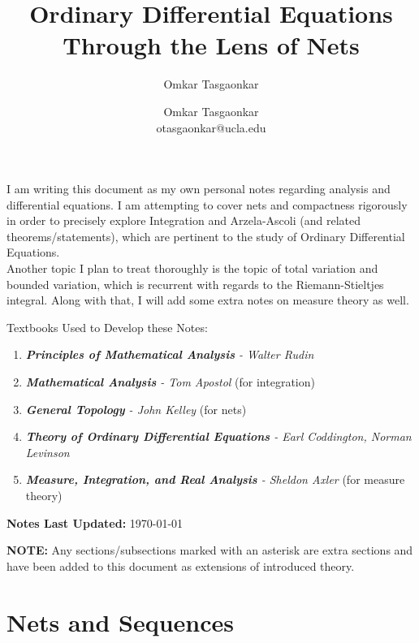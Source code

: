 \documentclass[10pt,letterpaper]{article} %
\author{Omkar Tasgaonkar}
\title{Ordinary Differential Equations \\[0.5em] \large Through the Lens of Nets}
\author{Omkar Tasgaonkar \\ \small otasgaonkar@ucla.edu}
\date{}
\begin{document}
\maketitle
I am writing this document as my own personal notes regarding analysis and differential equations. I am attempting to cover nets and compactness rigorously in order to precisely explore Integration and Arzela-Ascoli (and related theorems/statements), which are pertinent to the study of Ordinary Differential Equations.\\

Another topic I plan to treat thoroughly is the topic of total variation and bounded variation, which is recurrent with regards to the Riemann-Stieltjes integral. Along with that, I will add some extra notes on measure theory as well.\\

\begin{tcolorbox}[colback=white, colframe=black, arc=0mm]
Textbooks Used to Develop these Notes:
\begin{enumerate}
\item \textit{\textbf{Principles of Mathematical Analysis} - Walter Rudin}
\item \textit{\textbf{Mathematical Analysis} - Tom Apostol} (for integration)
\item \textit{\textbf{General Topology} - John Kelley} (for nets)
\item \textit{\textbf{Theory of Ordinary Differential Equations} - Earl Coddington, Norman Levinson}
\item \textit{\textbf{Measure, Integration, and Real Analysis} - Sheldon Axler} (for measure theory)
\end{enumerate}
\end{tcolorbox}
\begin{tcolorbox}[colback=white, colframe=black, arc=0mm]
\textbf{Notes Last Updated:} \today
\end{tcolorbox}
\thispagestyle{firstpage}
\newpage
\begin{tcolorbox}[colback=white, colframe=black, arc=0mm]
\tableofcontents
\end{tcolorbox}
\textbf{NOTE:} Any sections/subsections marked with an asterisk are extra sections and have been added to this document as extensions of introduced theory.
\setcounter{section}{-1}

\pagebreak

\section{Nets and Sequences}
\end{document}

